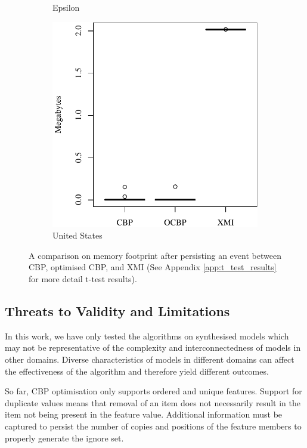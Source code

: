 \documentclass{llncs}
\begin{document}
\begin{figure}[ht]
\begin{subfigure}{0.325\textwidth}
    \caption{Epsilon}
    \label{fig:save_memory_epsilon}
\end{subfigure}
\hfill
\begin{subfigure}{0.325\textwidth}
    \centering
    \includegraphics[width=\linewidth]{images/save_memory_wikipedia}
    \caption{United States}
    \label{fig:save_memory_wikipedia}
\end{subfigure}
\caption{A comparison on memory footprint after persisting an event between CBP, optimised CBP, and XMI (See Appendix \ref{app:t_test_results} for more detail t-test results).}
\label{fig:savememory}
    \end{figure}
    
    
    
    \subsection{Threats to Validity and Limitations}
    \label{sec:limitations_and_future_work}
    In this work, we have only tested the algorithms on synthesised  models which may not be representative of the complexity and interconnectedness of models in other domains. Diverse characteristics of models in different domains can affect the effectiveness of the algorithm and therefore yield different outcomes. 
    
    So far, CBP optimisation only supports ordered and unique features. Support for duplicate values means that removal of an item does not necessarily result in the item not being present in the feature value. Additional information must be captured to persist the number of copies and positions of the feature members to properly generate the ignore set. 
    
\end{document}
